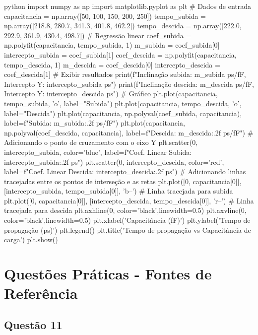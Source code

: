 \documentclass[12pt,a4paper]{article}
\begin{document}
\begin{codeblockm}{python}
import numpy as np
import matplotlib.pyplot as plt
# Dados de entrada
capacitancia = np.array([50, 100, 150, 200, 250])
tempo_subida = np.array([218.8, 280.7, 341.3, 401.8, 462.2])
tempo_descida = np.array([222.0, 292.9, 361.9, 430.4, 498.7])
# Regressão linear
coef_subida = np.polyfit(capacitancia, tempo_subida, 1)
m_subida = coef_subida[0]
intercepto_subida = coef_subida[1]
coef_descida = np.polyfit(capacitancia, tempo_descida, 1)
m_descida = coef_descida[0]
intercepto_descida = coef_descida[1]
# Exibir resultados
print(f"Inclinação subida: {m_subida} ps/fF, Intercepto Y: {intercepto_subida} ps")
print(f"Inclinação descida: {m_descida} ps/fF, Intercepto Y: {intercepto_descida} ps")
# Gráfico
plt.plot(capacitancia, tempo_subida, 'o', label="Subida")
plt.plot(capacitancia, tempo_descida, 'o', label="Descida")
plt.plot(capacitancia, np.polyval(coef_subida, capacitancia),
label=f"Subida: {m_subida:.2f} ps/fF")
plt.plot(capacitancia, np.polyval(coef_descida, capacitancia),
label=f"Descida: {m_descida:.2f} ps/fF")
# Adicionando o ponto de cruzamento com o eixo Y
plt.scatter(0, intercepto_subida, color='blue', label=f"Coef. Linear Subida: {intercepto_subida:.2f} ps")
plt.scatter(0, intercepto_descida, color='red', label=f"Coef. Linear Descida: {intercepto_descida:.2f} ps")
# Adicionando linhas tracejadas entre os pontos de interseção e as retas
plt.plot([0, capacitancia[0]], [intercepto_subida, tempo_subida[0]], 'b--')
# Linha tracejada para subida
plt.plot([0, capacitancia[0]], [intercepto_descida, tempo_descida[0]],
'r--') # Linha tracejada para descida
plt.axhline(0, color='black',linewidth=0.5)
plt.axvline(0, color='black',linewidth=0.5)
plt.xlabel('Capacitância (fF)')
plt.ylabel('Tempo de propagação (ps)')
plt.legend()
plt.title('Tempo de propagação vs Capacitância de carga')
plt.show()
\end{codeblockm}

\newpage

\section*{Questões Práticas - Fontes de Referência}

\subsection*{Questão 11}
\end{document}
